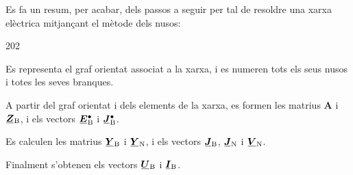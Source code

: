 Es fa un resum, per acabar, dels passos a seguir per tal de resoldre una
xarxa elèctrica mitjançant el mètode dels nusos:
\begin{dingautolist}{202}
   \item Es representa el graf orientat associat a la xarxa, i es numeren tots els seus nusos i totes les seves branques.
   \item A partir del graf orientat i dels elements de la xarxa, es formen les matrius $\boldsymbol{A}$ i $\mcmplx{Z}\ped{B}$, i els vectors $\mcmplx{E}\ped{B}^\bullet$ i $\mcmplx{J}\ped{B}^\bullet$.
   \item Es calculen les matrius $\mcmplx{Y}\ped{B}$ i $\mcmplx{Y}\ped{N}$, i els vectors $\mcmplx{J}\ped{B}$,  $\mcmplx{J}\ped{N}$ i $\mcmplx{V}\ped{N}$.
   \item Finalment s'obtenen els vectors  $\mcmplx{U}\ped{B}$ i $\mcmplx{I}\ped{B}$.
\end{dingautolist}


